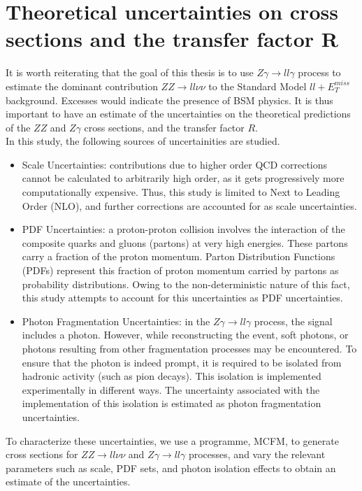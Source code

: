 \documentclass[11pt,a4paper,openright,twoside]{report}
\newcommand{\ZZ}{$ZZ\to ll\nu\nu$ }
\newcommand{\Zg}{$Z\gamma\to ll\gamma$ }
\newcommand{\llM}{$ll+E_T^{miss}$ }
\begin{document}
\chapter{Theoretical uncertainties on cross sections and the transfer factor R}

It is worth reiterating that the goal of this thesis is to use \Zg process to estimate the dominant contribution \ZZ to the Standard Model \llM background. Excesses would indicate the presence of BSM physics. It is thus important to have an estimate of the uncertainties on the theoretical predictions of the $ZZ$ and $Z\gamma$ cross sections, and the transfer factor $R$.\\
In this study, the following sources of uncertainities are studied.
\begin{itemize}
\item Scale Uncertainties: contributions due to higher order QCD corrections cannot be calculated to arbitrarily high order, as it gets progressively more computationally expensive. Thus, this study is limited to Next to Leading Order (NLO), and further corrections are accounted for as scale uncertainties.
\item PDF Uncertainties: a proton-proton collision involves the interaction of the composite quarks and gluons (partons) at very high energies. These partons carry a fraction of the proton momentum. Parton Distribution Functions (PDFs) represent this fraction of proton momentum carried by partons as probability distributions. Owing to the non-deterministic nature of this fact, this study attempts to account for this uncertainties as PDF uncertainties.
\item Photon Fragmentation Uncertainties: in the \Zg process, the signal includes a photon. However, while reconstructing the event, soft photons, or photons resulting from other fragmentation processes may be encountered. To ensure that the photon is indeed prompt, it is required to be isolated from hadronic activity (such as pion decays). This isolation is implemented experimentally in different ways. The uncertainty associated with the implementation of this isolation is estimated as photon fragmentation uncertainties.
\end{itemize}

To characterize these uncertainties, we use a programme, MCFM, to generate cross sections for \ZZ and \Zg processes, and vary the relevant parameters such as scale, PDF sets, and photon isolation effects to obtain an estimate of the uncertainties.
\end{document}
